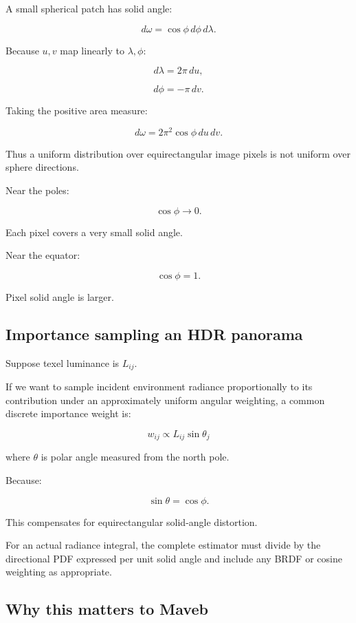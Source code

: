 A small spherical patch has solid angle:

\[ \boxed{ d\omega=\cos\phi\,d\phi\,d\lambda. } \]

Because \(u,v\) map linearly to \(\lambda,\phi\):

\[ d\lambda=2\pi\,du, \]

\[ d\phi=-\pi\,dv. \]

Taking the positive area measure:

\[ \boxed{ d\omega=2\pi^2\cos\phi\,du\,dv. } \]

Thus a uniform distribution over equirectangular image pixels is not uniform over sphere directions.

Near the poles:

\[ \cos\phi\to0. \]

Each pixel covers a very small solid angle.

Near the equator:

\[ \cos\phi=1. \]

Pixel solid angle is larger.

\subsection{Importance sampling an HDR panorama}\label{02-foundations-ii-ch035-importance-sampling-an-hdr-panorama}

Suppose texel luminance is \(L_{ij}\).

If we want to sample incident environment radiance proportionally to its contribution under an approximately uniform angular weighting, a common discrete importance weight is:

\[ \boxed{ w_{ij}\propto L_{ij}\sin\theta_j } \]

where \(\theta\) is polar angle measured from the north pole.

Because:

\[ \sin\theta=\cos\phi. \]

This compensates for equirectangular solid-angle distortion.

For an actual radiance integral, the complete estimator must divide by the directional PDF expressed per unit solid angle and include any BRDF or cosine weighting as appropriate.

\subsection{Why this matters to Maveb}\label{02-foundations-ii-ch035-why-this-matters-to-maveb}

